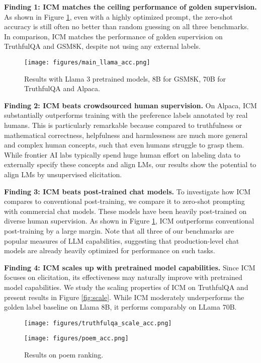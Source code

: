 \documentclass{article}
\newcommand{\ourmethod}[0]{\textsc{ICM}\xspace}
\begin{document}
\textbf{Finding 1: \ourmethod matches the ceiling performance of golden supervision.} As shown in Figure \ref{fig:main_results}, even with a highly optimized prompt, the zero-shot accuracy is still often no better than random guessing on all three benchmarks. In comparison, \ourmethod matches the performance of golden supervision on TruthfulQA and GSM8K, despite not using any external labels.


\begin{figure}[!t]
    \centering
    \texttt{[image: figures/main\_llama\_acc.png]}
    \caption{Results with Llama 3 pretrained models, 8B for GSM8K, 70B for TruthfulQA and Alpaca.}
    \label{fig:main_results}
\end{figure}

\textbf{Finding 2: \ourmethod beats crowdsourced human supervision.} On Alpaca, \ourmethod substantially outperforms training with the preference labels annotated by real humans. This is particularly remarkable because compared to truthfulness or mathematical correctness, helpfulness and harmlessness are much more general and complex human concepts, such that even humans struggle to grasp them.
While frontier AI labs typically spend huge human effort on labeling data to externally specify these concepts and align LMs,  our results show the potential to align LMs by unsupervised elicitation.


\textbf{Finding 3: \ourmethod beats post-trained chat models.} To investigate how \ourmethod compares to conventional post-training, we compare it to zero-shot prompting with commercial chat models. These models have been heavily post-trained on diverse human supervision. As shown in Figure \ref{fig:main_results}, \ourmethod outperforms conventional post-training by a large margin. Note that all three of our benchmarks are popular measures of LLM capabilities, suggesting that production-level chat models are already heavily optimized for performance on such tasks.


\textbf{Finding 4: \ourmethod scales up with pretrained model capabilities.} Since \ourmethod focuses on elicitation, its effectiveness may naturally improve with pretrained model capabilities. We study the scaling properties of \ourmethod on TruthfulQA and present results in Figure \ref{fig:scale}. While \ourmethod moderately underperforms the golden label baseline on Llama 8B, it performs comparably on LLama 70B.


\begin{figure}[!t]
  \centering
  \begin{minipage}[b]{0.61\textwidth}
    \centering
    \texttt{[image: figures/truthfulqa\_scale\_acc.png]}
    \caption{Scaling properties of \ourmethod on TruthfulQA.}
    \label{fig:scale}
  \end{minipage}
  \hfill %
  \begin{minipage}[b]{0.36
  \textwidth}
    \centering
    \texttt{[image: figures/poem\_acc.png]}
    \caption{Results on poem ranking.}
    \label{fig:poem}
  \end{minipage}
\end{figure}
\end{document}
